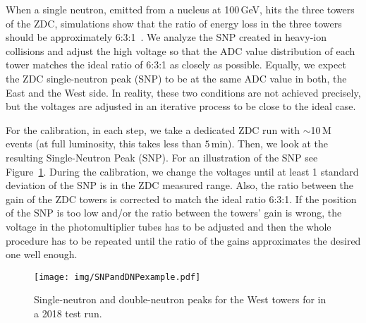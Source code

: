 When a single neutron, emitted from a nucleus at 100$\,$GeV, hits the three towers of the ZDC, simulations show that the ratio of energy loss
in the three towers should be 
approximately 6:3:1~\cite{ZDCphysics}\@. We analyze the SNP created in heavy-ion collisions and adjust the high voltage so that the ADC value 
distribution of each tower matches the ideal ratio of 6:3:1 as closely as possible. Equally, we expect the ZDC 
single-neutron peak (SNP) to
be at the same ADC value in both, the East and the West side. In reality, these two conditions are not achieved precisely, but the voltages are adjusted in an iterative process to be close to the ideal case.



% 



For the calibration, in each step, we take a dedicated ZDC run with
$\sim$10$\,$M events (at full luminosity, this takes less than $5\,$min). Then, we
look at the resulting Single-Neutron Peak (SNP).
For an illustration of the SNP see Figure~\ref{SNPillustration}\@.
During the calibration, we change the voltages until at least 1 standard deviation of the SNP is in the ZDC measured
range. Also, the ratio between the gain of the ZDC towers is corrected to match the ideal ratio 6:3:1\@. If the position of the SNP is too low and/or the ratio between the towers' gain is wrong,
the voltage in the photomultiplier tubes has to be adjusted and then the whole procedure
has to be repeated until the ratio of the gains approximates the desired one well enough.


\begin{figure}[htb]
\begin{center}
\texttt{[image: img/SNPandDNPexample.pdf]}
\end{center}
\caption{\label{SNPillustration} Single-neutron and double-neutron peaks for the West towers for in a 2018 test run.}

\end{figure}

